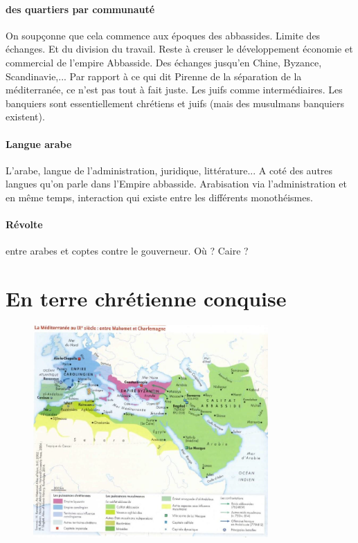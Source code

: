 \paragraph{des quartiers par communauté} On soupçonne que cela commence aux époques des abbassides. Limite des échanges. Et du division du travail. Reste à creuser le développement économie et commercial de l'empire Abbasside. Des échanges jusqu'en Chine, Byzance, Scandinavie,...
Par rapport à ce qui dit Pirenne de la séparation de la méditerranée, ce n'est pas tout à fait juste. Les juifs comme intermédiaires.
Les banquiers sont essentiellement chrétiens et juifs (mais des musulmans banquiers existent).


\paragraph{Langue arabe} L'arabe, langue de l'administration, juridique, littérature... A coté des autres langues qu'on parle dans l'Empire abbasside. Arabisation via l'administration et en même temps, interaction qui existe entre les différents monothéismes. 

\paragraph{Révolte} entre arabes et coptes contre le gouverneur.  Où ? Caire ? 





\section{En terre chrétienne conquise}
\begin{figure}
    \centering
\includegraphics[width=0.8\textwidth]{HistoireIslamMediterranee/Images/MedIXe.png}
    \label{fig:my_label}
\end{figure}

